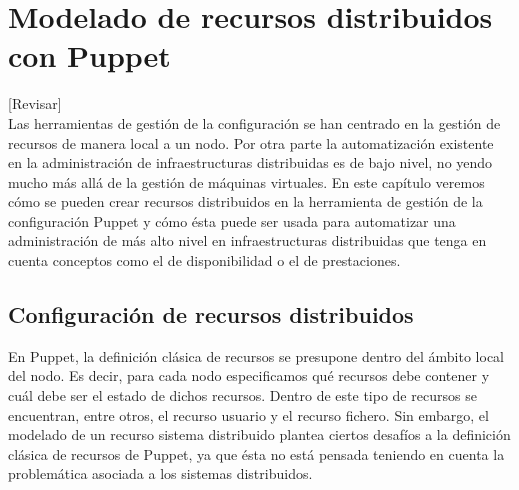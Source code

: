 \chapter{Modelado de recursos distribuidos con Puppet}
\label{cap:modelado}

[Revisar]\\

Las herramientas de gestión de la configuración se han centrado en la gestión de recursos de manera local a un nodo. Por otra parte la automatización existente en la administración de infraestructuras distribuidas es de bajo nivel, no yendo mucho más allá de la gestión de máquinas virtuales. En este capítulo veremos cómo se pueden crear recursos distribuidos en la herramienta de gestión de la configuración Puppet y cómo ésta puede ser usada para automatizar una administración de más alto nivel en infraestructuras distribuidas que tenga en cuenta conceptos como el de disponibilidad o el de prestaciones.


\section{Configuración de recursos distribuidos}

En Puppet, la definición clásica de recursos se presupone dentro del ámbito local del nodo. Es decir, para cada nodo especificamos qué recursos debe contener y cuál debe ser el estado de dichos recursos. Dentro de este tipo de recursos se encuentran, entre otros, el recurso usuario y el recurso fichero. Sin embargo, el modelado de un recurso sistema distribuido plantea ciertos desafíos a la definición clásica de recursos de Puppet, ya que ésta no está pensada teniendo en cuenta la problemática asociada a los sistemas distribuidos. \\


